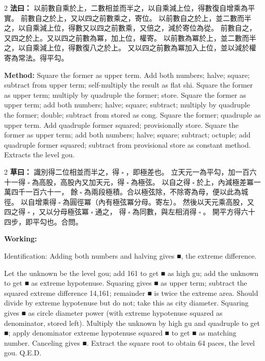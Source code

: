 \documentclass[11pt,a4paper]{article}
\let\origsquare\square
\renewcommand{\square}{\ensuremath{\origsquare}}%
\newcommand{\fayue}[1]{%
  \noindent\textcolor{methodcolor}{\textbf{法曰：}}{\tradfont #1}\par\nopagebreak%
}
\newcommand{\fayueeng}[1]{%
  \noindent\textcolor{engcolor}{\textbf{Method: }}{#1}\par\nopagebreak%
}
\newcommand{\tsaoyue}[1]{%
  \noindent\textcolor{workcolor}{\textbf{草曰：}}{\tradfont #1}\par%
}
\newcommand{\tsaoyueeng}[1]{%
  \noindent\textcolor{engcolor}{\textbf{Working: }}{\small #1}\par%
}
\begin{document}
\begin{paracol}{2}
\fayue{%
以前數自乘於上，二數相並而半之，以自乘減上位，得數復自增乘為平實。
前數自之於上，又以四之前數乘之，寄位。
以前數自之於上，並二數而半之，以自乘減上位，得數又以四之前數乘，又倍之，減於寄位為從。
前數自之，又四之於上。又以四之前數為冪，加上位，權寄。
以前數為冪於上，並二數而半之，以自乘減上位，得數復八之於上。
又以四之前數為冪加入上位，並以減於權寄為常法。得平勾。}
\switchcolumn
\fayueeng{%
Square the former as upper term. Add both numbers; halve; square; subtract from upper term; self-multiply the result as flat shi. Square the former as upper term; multiply by quadruple the former; store. Square the former as upper term; add both numbers; halve; square; subtract; multiply by quadruple the former; double; subtract from stored as cong. Square the former; quadruple as upper term. Add quadruple former squared; provisionally store. Square the former as upper term; add both numbers; halve; square; subtract; octuple; add quadruple former squared; subtract from provisional store as constant method. Extracts the level gou.}
\end{paracol}

\begin{paracol}{2}
\tsaoyue{%
識別得二位相並而半之，得$ \; \square \; $，即極差也。
立天元一為平勾，加一百六十一得$ \; \square \; $為高股，高股內又加天元，得$ \; \square \; $為極弦。
以自之得$ \; \square \; $於上，內減極差冪一萬四千一百六十一，
餘$ \; \square \; $為兩段極積。合以極弦除，不除寄為母，便以此為城徑。
以自增乘得$ \; \square \; $為圓徑冪（內有極弦冪分母。寄左）。
然後以天元乘高股，又四之得$ \; \square \; $，又以分母極弦冪$ \; \square \; $通之，
得$ \; \square \; $為同數，與左相消得$ \; \square \; $。
開平方得六十四步，即平勾也。合問。}
\switchcolumn
\tsaoyueeng{%
Identification: Adding both numbers and halving gives ■, the extreme difference.

Let the unknown be the level gou; add 161 to get ■ as high gu; add the unknown to get ■ as extreme hypotenuse. Squaring gives ■ as upper term; subtract the squared extreme difference 14,161; remainder ■ is twice the extreme area. Should divide by extreme hypotenuse but do not; take this as city diameter. Squaring gives ■ as circle diameter power (with extreme hypotenuse squared as denominator, stored left). Multiply the unknown by high gu and quadruple to get ■; apply denominator extreme hypotenuse squared ■ to get ■ as matching number. Canceling gives ■. Extract the square root to obtain 64 paces, the level gou. Q.E.D.}
\end{paracol}
\end{document}
